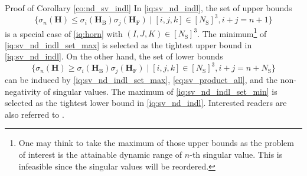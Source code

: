 \documentclass[journal]{IEEEtran}
\begin{document}
\begin{appendix}
	\begin{subsection}{Proof of Corollary \ref{co:nd_sv_indl}}
		\label{ap:nd_sv_indl}
		In \eqref{iq:sv_nd_indl}, the set of upper bounds
		\begin{equation}
			\label{iq:sv_nd_indl_set_max}
			\bigl\{\sigma_n(\mathbf{H}) \le \sigma_i(\mathbf{H}_\mathrm{B}) \sigma_j(\mathbf{H}_\mathrm{F}) \mid [i,j,k] \in [N_\mathrm{S}]^3, i+j=n+1\bigr\}
		\end{equation}
		is a special case of \eqref{iq:horn} with $(I, J, K) \in [N_\mathrm{S}]^3$.
		The minimum\footnote{One may think to take the maximum of those upper bounds as the problem of interest is the attainable dynamic range of $n$-th singular value. This is infeasible since the singular values will be reordered.} of \eqref{iq:sv_nd_indl_set_max} is selected as the tightest upper bound in \eqref{iq:sv_nd_indl}.
		On the other hand, the set of lower bounds
		\begin{equation}
			\label{iq:sv_nd_indl_set_min}
			\bigl\{\sigma_n(\mathbf{H}) \ge \sigma_i(\mathbf{H}_\mathrm{B}) \sigma_j(\mathbf{H}_\mathrm{F}) \mid [i,j,k] \in [N_\mathrm{S}]^3, i+j=n+N_\mathrm{S}\bigr\}
		\end{equation}
		can be induced by \eqref{iq:sv_nd_indl_set_max}, \eqref{eq:sv_product_all}, and the non-negativity of singular values.
		The maximum of \eqref{iq:sv_nd_indl_set_min} is selected as the tightest lower bound in \eqref{iq:sv_nd_indl}.
		Interested readers are also referred to \cite[(2.0.3)]{Zhang2005}.


\end{subsection}
\end{appendix}
\end{document}
